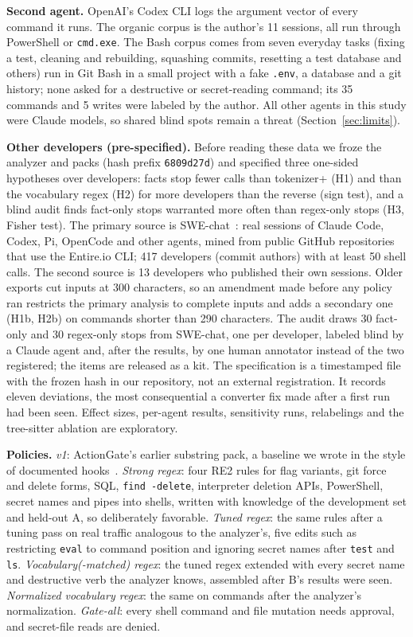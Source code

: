 \documentclass[conference]{IEEEtran}
\newcommand{\cmd}[1]{\texttt{\relscale{0.9}#1}}
\begin{document}
\textbf{Second agent.} OpenAI's Codex CLI logs the argument vector of every command it runs. The organic corpus is the author's 11 sessions, all run through PowerShell or \cmd{cmd.exe}. The Bash corpus comes from seven everyday tasks (fixing a test, cleaning and rebuilding, squashing commits, resetting a test database and others) run in Git Bash in a small project with a fake \cmd{.env}, a database and a git history; none asked for a destructive or secret-reading command; its 35 commands and 5 writes were labeled by the author. All other agents in this study were Claude models, so shared blind spots remain a threat (Section~\ref{sec:limits}).

\textbf{Other developers (pre-specified).} Before reading these data we froze the analyzer and packs (hash prefix \texttt{6809d27d}) and specified three one-sided hypotheses over developers: facts stop fewer calls than tokenizer+ (H1) and than the vocabulary regex (H2) for more developers than the reverse (sign test), and a blind audit finds fact-only stops warranted more often than regex-only stops (H3, Fisher test). The primary source is SWE-chat~\cite{baumann2026swechat}: real sessions of Claude Code, Codex, Pi, OpenCode and other agents, mined from public GitHub repositories that use the Entire.io CLI; 417 developers (commit authors) with at least 50 shell calls. The second source is 13 developers who published their own sessions. Older exports cut inputs at 300 characters, so an amendment made before any policy ran restricts the primary analysis to complete inputs and adds a secondary one (H1b, H2b) on commands shorter than 290 characters. The audit draws 30 fact-only and 30 regex-only stops from SWE-chat, one per developer, labeled blind by a Claude agent and, after the results, by one human annotator instead of the two registered; the items are released as a kit. The specification is a timestamped file with the frozen hash in our repository, not an external registration. It records eleven deviations, the most consequential a converter fix made after a first run had been seen. Effect sizes, per-agent results, sensitivity runs, relabelings and the tree-sitter ablation are exploratory.

\textbf{Policies.} \emph{v1}: ActionGate's earlier substring pack, a baseline we wrote in the style of documented hooks~\cite{claudecode_hooks}. \emph{Strong regex}: four RE2 rules for flag variants, git force and delete forms, SQL, \cmd{find -delete}, interpreter deletion APIs, PowerShell, secret names and pipes into shells, written with knowledge of the development set and held-out A, so deliberately favorable. \emph{Tuned regex}: the same rules after a tuning pass on real traffic analogous to the analyzer's, five edits such as restricting \cmd{eval} to command position and ignoring secret names after \cmd{test} and \cmd{ls}. \emph{Vocabulary(-matched) regex}: the tuned regex extended with every secret name and destructive verb the analyzer knows, assembled after B's results were seen. \emph{Normalized vocabulary regex}: the same on commands after the analyzer's normalization. \emph{Gate-all}: every shell command and file mutation needs approval, and secret-file reads are denied.
\end{document}
